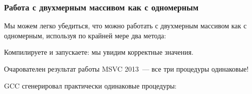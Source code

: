 ﻿\subsubsection{Работа с двухмерным массивом как с одномерным}

Мы можем легко убедиться, что можно работать с двухмерным массивом как с одномерным,
используя по крайней мере два метода:



Компилируете и запускаете: мы увидим корректные значения.

Очарователен результат работы MSVC 2013~--- все три процедуры одинаковые!



GCC сгенерировал практически одинаковые процедуры:



